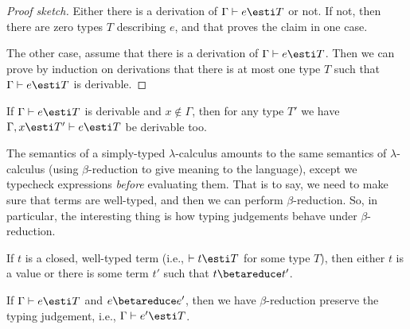 \begin{node}[Syntax]
\begin{proof}[Proof sketch]
Either there is a derivation of $\Gamma\vdash e\esti T$ or not. If not,
then there are zero types $T$ describing $e$, and that proves the claim
in one case.

The other case, assume that there is a derivation of $\Gamma\vdash e\esti T$.
Then we can prove by induction on derivations that there is at most one
type $T$ such that $\Gamma\vdash e\esti T$ is derivable.
\end{proof}

\begin{theorem}[Weakening]
If $\Gamma\vdash e\esti T$ is derivable and $x\notin\Gamma$, then
for any type $T'$ we have $\Gamma,x\esti T'\vdash e\esti T$ be derivable too.
\end{theorem}

\end{node}

\begin{node}[Semantics]\label{stlc-000I}%

\begin{node}\label{stlc-000J}%
The semantics of a simply-typed $\lambda$-calculus amounts to the same
semantics of $\lambda$-calculus (using $\beta$-reduction to give meaning
to the language), except we typecheck expressions \emph{before}
evaluating them. That is to say, we need to make sure that terms are
well-typed, and then we can perform $\beta$-reduction. So, in
particular, the interesting thing is how typing judgements behave under
$\beta$-reduction. 
\end{node}

\begin{theorem}[Progress]
If $t$ is a closed, well-typed term (i.e., $\vdash t\esti T$ for some
type $T$), then either $t$ is a value or there is some term $t'$ such
that $t\betareduce t'$.
\end{theorem}

\begin{theorem}[Preservation]
If $\Gamma\vdash e\esti T$ and $e\betareduce e'$, then we have
$\beta$-reduction preserve the typing judgement, i.e., $\Gamma\vdash e'\esti T$.
\end{theorem}
  
\end{node}
